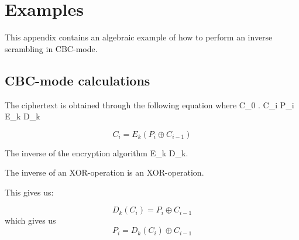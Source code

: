 \chapter{Examples}\label{app:examples}
This appendix contains an algebraic example of how to perform an 
inverse scrambling in CBC-mode.

\section*{CBC-mode calculations} \label{sec:CBCcalc}
The ciphertext is obtained through the following equation where 
\newline
C_{0}  \newline
{}\oplus. \newline
C_i  \newline
P_i  \newline
E_k  \newline
D_k  \newline

\begin{equation}
C_{i} = E_{k}(P_{i} \oplus C_{i-1})
\end{equation}

The inverse of the encryption algorithm E_{k}  D_{k}.

The inverse of an XOR-operation is an XOR-operation.

This gives us:

\begin{equation}
D_{k}(C_{i}) = P_{i} \oplus C_{i-1}
\end{equation}
which gives us
\begin{equation}
P_{i} = D_{k}(C_{i})\oplus C_{i-1}
\end{equation}
